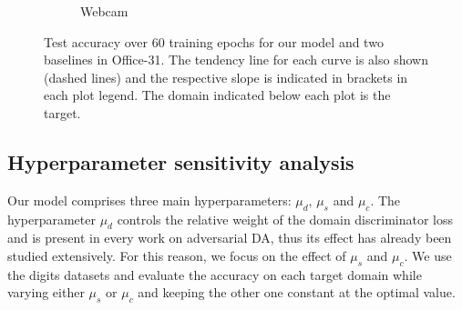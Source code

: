 \begin{figure}
\begin{subfigure}[b]{0.32\textwidth}
		\caption{Webcam}
	\end{subfigure}
	\caption{Test accuracy over 60 training epochs for our model and two baselines in Office-31. The tendency line for each curve is also shown (dashed lines) and the respective slope is indicated in brackets in each plot legend. The domain indicated below each plot is the target.}
	\label{fig:overtrain}
\end{figure}

\subsection{Hyperparameter sensitivity analysis}
\label{sec:hyperparam}
Our model comprises three main hyperparameters: $\mu_d$, $\mu_s$ and $\mu_c$. The hyperparameter $\mu_d$ controls the relative weight of the domain discriminator loss and is present in every work on adversarial DA, thus its effect has already been studied extensively. For this reason, we focus on the effect of $\mu_s$ and $\mu_c$. We use the digits datasets and evaluate the accuracy on each target domain while varying either $\mu_s$ or $\mu_c$ and keeping the other one constant at the optimal value.

